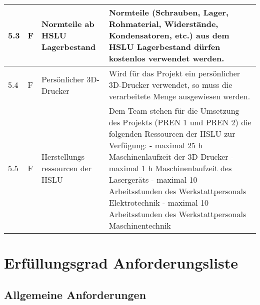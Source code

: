 \documentclass[main.tex]{subfiles} %
\begin{document}
\begin{tabular}{|l|p{0.5cm}|p{4cm}|p{10cm}|}
  \hline
  5.3          & F          & Normteile ab HSLU Lagerbestand   & Normteile (Schrauben, Lager, Rohmaterial, Widerstände, Kondensatoren, etc.) aus dem HSLU Lagerbestand dürfen kostenlos verwendet werden.                                                                                                                                                                                                                                                      \\
  \hline
  5.4          & F          & Persönlicher 3D-Drucker          & Wird für das Projekt ein persönlicher 3D-Drucker verwendet, so muss die verarbeitete Menge ausgewiesen werden.                                                                                                                                                                                                                                                                                \\
  \hline
  5.5          & F          & Herstellungs-ressourcen der HSLU & Dem Team stehen für die Umsetzung des Projekts (PREN 1 und PREN 2) die folgenden Ressourcen der HSLU zur Verfügung: \newline - maximal 25 h Maschinenlaufzeit der 3D-Drucker \newline - maximal 1 h Maschinenlaufzeit des Lasergeräts \newline - maximal 10 Arbeitsstunden des Werkstattpersonals Elektrotechnik \newline - maximal 10 Arbeitsstunden des Werkstattpersonals Maschinentechnik \\
  \hline
\end{tabular}

\newpage

\section{Erfüllungsgrad Anforderungsliste}

\subsection*{Allgemeine Anforderungen}
\end{document}
